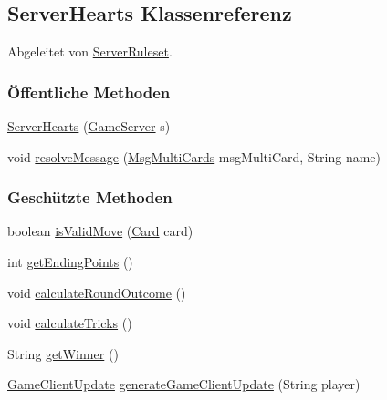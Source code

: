 \hypertarget{a00067}{\subsection{Server\-Hearts Klassenreferenz}
\label{a00067}
}


Abgeleitet von \hyperlink{a00068}{Server\-Ruleset}.

\subsubsection*{Öffentliche Methoden}
\begin{DoxyCompactItemize}
\item 
\hypertarget{a00067_a079b5eaa797ef9f3ccdc71b812fbcd69}{\hyperlink{a00067_a079b5eaa797ef9f3ccdc71b812fbcd69}{Server\-Hearts} (\hyperlink{a00072}{Game\-Server} s)}\label{a00067_a079b5eaa797ef9f3ccdc71b812fbcd69}

\item 
void \hyperlink{a00067_abc96b962b5e60c8c0203985dc7d455c2}{resolve\-Message} (\hyperlink{a00046}{Msg\-Multi\-Cards} msg\-Multi\-Card, String name)
\end{DoxyCompactItemize}
\subsubsection*{Geschützte Methoden}
\begin{DoxyCompactItemize}
\item 
boolean \hyperlink{a00067_aa58080772a961e1f9f88d766777f82ed}{is\-Valid\-Move} (\hyperlink{a00054}{Card} card)
\item 
int \hyperlink{a00067_aea8671bc04a1458c6602f409eb404ec2}{get\-Ending\-Points} ()
\item 
\hypertarget{a00067_aceebbbc4dd4d00fe4e4086be6acda2d7}{void \hyperlink{a00067_aceebbbc4dd4d00fe4e4086be6acda2d7}{calculate\-Round\-Outcome} ()}\label{a00067_aceebbbc4dd4d00fe4e4086be6acda2d7}

\item 
\hypertarget{a00067_a0e9e22cb0e4021e9b0fff0aa0dba1499}{void \hyperlink{a00067_a0e9e22cb0e4021e9b0fff0aa0dba1499}{calculate\-Tricks} ()}\label{a00067_a0e9e22cb0e4021e9b0fff0aa0dba1499}

\item 
\hypertarget{a00067_a159081d6eb49d67e8fe72bc03a47c336}{String \hyperlink{a00067_a159081d6eb49d67e8fe72bc03a47c336}{get\-Winner} ()}\label{a00067_a159081d6eb49d67e8fe72bc03a47c336}

\item 
\hyperlink{a00059}{Game\-Client\-Update} \hyperlink{a00067_ae26f0271bee2539ca4acd6b646ad895a}{generate\-Game\-Client\-Update} (String player)
\end{DoxyCompactItemize}
